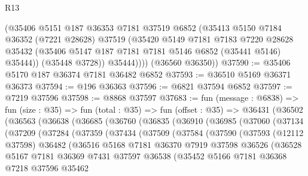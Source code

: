\begin{lexlean}{R13}
\begin{coremodule}
            (@35406
              @5151
              @187
              @36353
              @7181
              @37519
              @6852
              (@35413
                @5150
                @7184
                @36352
                (@7221 @28628)
                @37519
                (@35420
                  @5149
                  @7181
                  @7183
                  @7220
                  @28628
                  @35432
                  (@35406 @5147 @187 @7181 @7181 @5146 @6852 (@35441 @5146) @35444))
                (@35448 @3728))
              @35444))))
      (@36560 @36350))
@37590 := @35406 @5170 @187 @36374 @7181 @36482 @6852
@37593 := @36510 @5169 @36371 @36373
@37594 := @196 @36363
@37596 := @6821 @37594 @6852
@37597 := @7219 @37596
@37598 := @8868 @37597
@37683 := fun (message : @6838) =>
  fun (size : @35) =>
  fun (total : @35) =>
  fun (offset : @35) =>
  @36431
    (@36502
      (@36563
        (@36638
          (@36685
            (@36760
              (@36835
                (@36910
                  (@36985
                    (@37060
                      (@37134
                        (@37209
                          (@37284
                            (@37359
                              (@37434
                                (@37509
                                  (@37584
                                    (@37590
                                      (@37593
                                        (@12112 @37598)
                                        @36482
                                        (@36516
                                          @5168
                                          @7181
                                          @36370
                                          @7919
                                          @37598
                                          @36526
                                          (@36528
                                            @5167
                                            @7181
                                            @36369
                                            @7431
                                            @37597
                                            @36538
                                            (@35452
                                              @5166
                                              @7181
                                              @36368
                                              @7218
                                              @37596
                                              @35462

\end{coremodule}
\end{lexlean}
